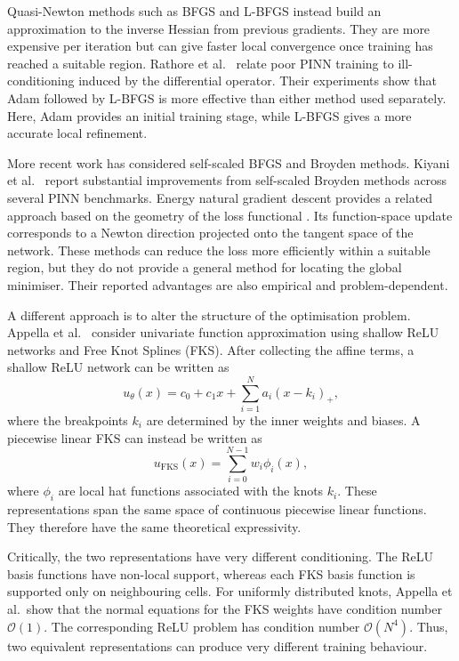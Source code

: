 \documentclass[11pt, onecolumn]{report}
\begin{document}
Quasi-Newton methods such as BFGS and L-BFGS instead build an approximation to the inverse Hessian from previous gradients. They are more expensive per iteration but can give faster local convergence once training has reached a suitable region. Rathore et al.\ \cite{Rathore_PINNLossLandscape} relate poor PINN training to ill-conditioning induced by the differential operator. Their experiments show that Adam followed by L-BFGS is more effective than either method used separately. Here, Adam provides an initial training stage, while L-BFGS gives a more accurate local refinement.

More recent work has considered self-scaled BFGS and Broyden methods. Kiyani et al.\ \cite{Kiyani_OptimizingOptimizer} report substantial improvements from self-scaled Broyden methods across several PINN benchmarks. Energy natural gradient descent provides a related approach based on the geometry of the loss functional \cite{MullerZeinhofer_ENGD}. Its function-space update corresponds to a Newton direction projected onto the tangent space of the network. These methods can reduce the loss more efficiently within a suitable region, but they do not provide a general method for locating the global minimiser. Their reported advantages are also empirical and problem-dependent.

A different approach is to alter the structure of the optimisation problem. Appella et al.\ \cite{AppellaEtAl} consider univariate function approximation using shallow ReLU networks and Free Knot Splines (FKS). After collecting the affine terms, a shallow ReLU network can be written as
\begin{equation*}
    u_{\theta}(x)
    =
    c_0+c_1x+\sum_{i=1}^{N}a_i(x-k_i)_+,
\end{equation*}
where the breakpoints $k_i$ are determined by the inner weights and biases. A piecewise linear FKS can instead be written as
\begin{equation*}
    u_{\mathrm{FKS}}(x)
    =
    \sum_{i=0}^{N-1}w_i\phi_i(x),
\end{equation*}
where $\phi_i$ are local hat functions associated with the knots $k_i$. These representations span the same space of continuous piecewise linear functions. They therefore have the same theoretical expressivity.

Critically, the two representations have very different conditioning. The ReLU basis functions have non-local support, whereas each FKS basis function is supported only on neighbouring cells. For uniformly distributed knots, Appella et al.\ show that the normal equations for the FKS weights have condition number $\mathcal{O}(1)$. The corresponding ReLU problem has condition number $\mathcal{O}(N^4)$. Thus, two equivalent representations can produce very different training behaviour.
\end{document}
